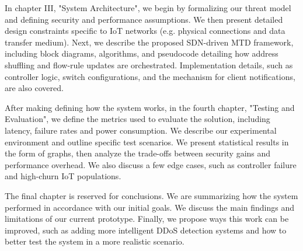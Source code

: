 In chapter III, "System Architecture", we begin by formalizing our threat model and defining security and performance assumptions. We then present detailed design constraints specific to IoT networks (e.g. physical connections and data transfer medium). Next, we describe the proposed SDN-driven MTD framework, including block diagrams, algorithms, and pseudocode detailing how address shuffling and flow-rule updates are orchestrated. Implementation details, such as controller logic, switch configurations, and the mechanism for client notifications, are also covered.

After making defining how the system works, in the fourth chapter, "Testing and Evaluation", we define the metrics used to evaluate the solution, including latency, failure rates and power consumption. We describe our experimental environment and outline specific test scenarios. We present statistical results in the form of graphs, then analyze the trade-offs between security gains and performance overhead. We also discuss a few edge cases, such as controller failure and high-churn IoT populations.

The final chapter is reserved for conclusions. We are summarizing how the system performed in accordance with our initial goals. We discuss the main findings and limitations of our current prototype. Finally, we propose ways this work can be improved, such as adding more intelligent DDoS detection systems and how to better test the system in a more realistic scenario.